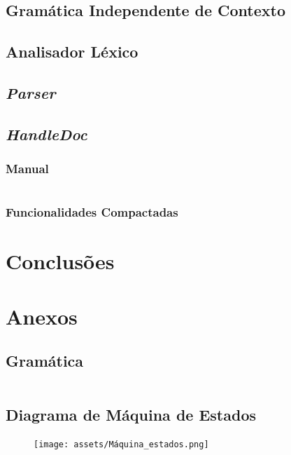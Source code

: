 \documentclass[11pt]{report}
\begin{document}
\section{Gramática Independente de Contexto} \label{subsec:grammar}


\section{Analisador Léxico} \label{subsec:lex}


\section{\textit{Parser}} \label{subsec:strat}



\section{\textit{HandleDoc}}
\subsection{Manual}
\inputminted{bash}{../assets/manual.txt}

\subsection{Funcionalidades Compactadas}



\chapter{Conclusões}



\chapter{Anexos}\label{sec:anexos}

\section{Gramática} \label{fig:grammar}
\inputminted{bash}{assets/gramatica.txt}

\section{Diagrama de Máquina de Estados}
\begin{figure}[!ht]
    \centering
    \texttt{[image: assets/Máquina\_estados.png]}
\end{figure}
\end{document}
